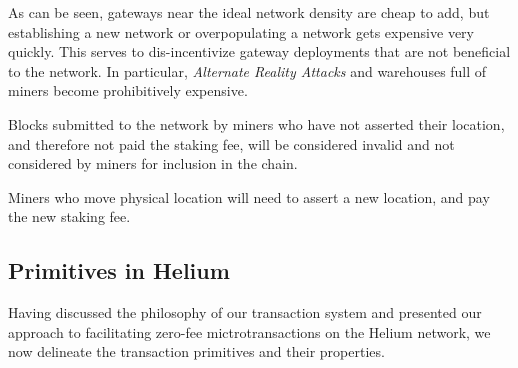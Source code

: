 \documentclass[UTF8, 10pt, nonatbib, nocopyrightspace, reprint]{sigplanconf}
\begin{document}
As can be seen, gateways near the ideal network density are cheap to add, but establishing a new network or overpopulating a network gets expensive very quickly. This serves to dis-incentivize gateway deployments that are not beneficial to the network. In particular, \emph{Alternate Reality Attacks} and warehouses full of miners become prohibitively expensive.

Blocks submitted to the network by miners who have not asserted their location, and therefore not paid the staking fee, will be considered invalid and not considered by miners for inclusion in the chain.

Miners who move physical location will need to assert a new location, and pay the new staking fee.

\subsection{Primitives in Helium} \label{primitives}
Having discussed the philosophy of our transaction system and presented our approach to facilitating zero-fee mictrotransactions on the Helium network, we now delineate the transaction primitives and their properties.
\end{document}
